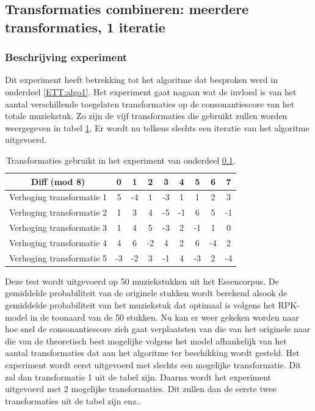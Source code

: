 \subsection{Transformaties combineren: meerdere transformaties, 1 iteratie}
\label{experiment:2}
\subsubsection{Beschrijving experiment}
Dit experiment heeft betrekking tot het algoritme dat besproken werd in onderdeel \ref{ETT:algo1}. Het experiment gaat nagaan wat de invloed is van het aantal verschillende toegelaten transformaties op de consonantiescore van het totale muziekstuk. Zo zijn de vijf transformaties die gebruikt zullen worden weergegeven in tabel \ref{tabel:exp2}. Er wordt nu telkens slechts een iteratie van het algoritme uitgevoerd.\\

\begin{table}
  \centering
  \begin{tabular}{c | c c c c c c c c }
    Diff (mod 8) & 0 & 1 & 2 & 3 & 4 & 5 & 6 & 7 \\
    \hline
    \hline
    Verhoging transformatie 1 & 5 & -4 & 1 & -3 & 1 & 1 & 2 & 3 \\
    \hline
    Verhoging transformatie 2 & 1 & 3 & 4 & -5 & -1 & 6 & 5 & -1 \\
    \hline
    Verhoging transformatie 3 & 1 & 4 & 5 & -3 & 2 & -1 & 1 & 0 \\
    \hline
    Verhoging transformatie 4 & 4 & 6 & -2 & 4 & 2 & 6 & -4 & 2 \\
    \hline
    Verhoging transformatie 5 & -3 & -2 & 3 & -1 & 4 & -3 & 2 & -4 \\
  \end{tabular}
  \caption{Transformaties gebruikt in het experiment van onderdeel \ref{experiment:2}.}
  \label{tabel:exp2}
\end{table}

Deze test wordt uitgevoerd op 50 muziekstukken uit het Essencorpus. De gemiddelde probabiliteit van de originele stukken wordt berekend alsook de gemiddelde probabiliteit van het muziekstuk dat optimaal is volgens het RPK-model in de toonaard van de 50 stukken. Nu kan er weer gekeken worden naar hoe snel de consonantiescore zich gaat verplaatsten van die van het originele naar die van de theoretisch best mogelijke volgens het model afhankelijk van het aantal transformaties dat aan het algoritme ter beschikking wordt gesteld. Het experiment wordt eerst uitgevoerd met slechts een mogelijke transformatie. Dit zal dan transformatie 1 uit de tabel zijn. Daarna wordt het experiment uitgevoerd met 2 mogelijke transformaties. Dit zullen dan de eerste twee transformaties uit de tabel zijn enz..

